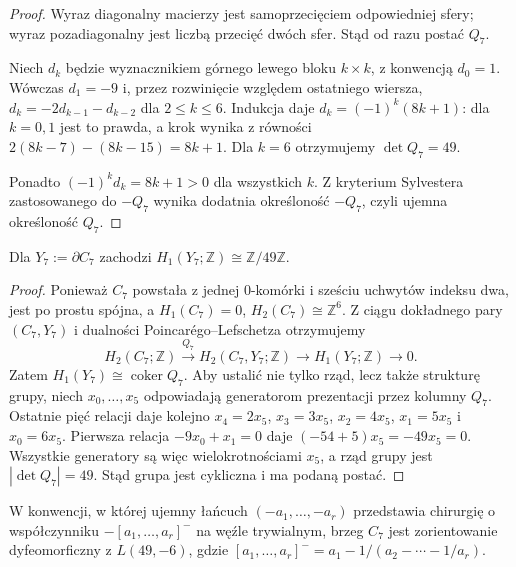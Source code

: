 \begin{proof}
Wyraz diagonalny macierzy jest samoprzecięciem
odpowiedniej sfery; wyraz pozadiagonalny jest liczbą
przecięć dwóch sfer. Stąd od razu postać $Q_7$.

Niech $d_k$ będzie wyznacznikiem górnego lewego bloku
$k\times k$, z konwencją $d_0=1$. Wówczas
$d_1=-9$ i, przez rozwinięcie względem ostatniego wiersza,
$d_k=-2d_{k-1}-d_{k-2}$ dla $2\le k\le6$.
Indukcja daje $d_k=(-1)^k(8k+1)$: dla $k=0,1$
jest to prawda, a krok wynika z równości
$2(8k-7)-(8k-15)=8k+1$.
Dla $k=6$ otrzymujemy $\det Q_7=49$.

Ponadto $(-1)^k d_k=8k+1>0$ dla wszystkich $k$.
Z kryterium Sylvestera zastosowanego do $-Q_7$
wynika dodatnia określoność $-Q_7$, czyli ujemna
określoność $Q_7$.
\end{proof}

\begin{stwierdzenie}
\label{prop:tg-park-h1-boundary}
Dla $Y_7:=\partial C_7$ zachodzi
$H_1(Y_7;\mathbb Z)\cong\mathbb Z/49\mathbb Z$.
\end{stwierdzenie}

\begin{proof}
Ponieważ $C_7$ powstała z jednej $0$-komórki i sześciu
uchwytów indeksu dwa, jest po prostu spójna, a
$H_1(C_7)=0$, $H_2(C_7)\cong\mathbb Z^6$. Z ciągu
dokładnego pary $(C_7,Y_7)$ i dualności Poincarégo--Lefschetza
otrzymujemy
\[
H_2(C_7;\mathbb Z)\xrightarrow{Q_7}
H_2(C_7,Y_7;\mathbb Z)\longrightarrow
H_1(Y_7;\mathbb Z)\longrightarrow0.
\]
Zatem $H_1(Y_7)\cong\operatorname{coker}Q_7$.
Aby ustalić nie tylko rząd, lecz także strukturę grupy,
niech $x_0,\ldots,x_5$ odpowiadają generatorom prezentacji
przez kolumny $Q_7$. Ostatnie pięć relacji daje kolejno
$x_4=2x_5$, $x_3=3x_5$, $x_2=4x_5$,
$x_1=5x_5$ i $x_0=6x_5$.
Pierwsza relacja $-9x_0+x_1=0$ daje
$(-54+5)x_5=-49x_5=0$.
Wszystkie generatory są więc wielokrotnościami $x_5$,
a rząd grupy jest $|\det Q_7|=49$. Stąd grupa jest
cykliczna i ma podaną postać.
\end{proof}

\begin{stwierdzenie}
\label{prop:tg-park-lens}
W konwencji, w której ujemny łańcuch $(-a_1,\ldots,-a_r)$
przedstawia chirurgię o współczynniku
$- [a_1,\ldots,a_r]^-$ na węźle trywialnym,
brzeg $C_7$ jest zorientowanie dyfeomorficzny z
$L(49,-6)$, gdzie
$[a_1,\ldots,a_r]^-=a_1-1/(a_2-\cdots-1/a_r)$.
\end{stwierdzenie}

